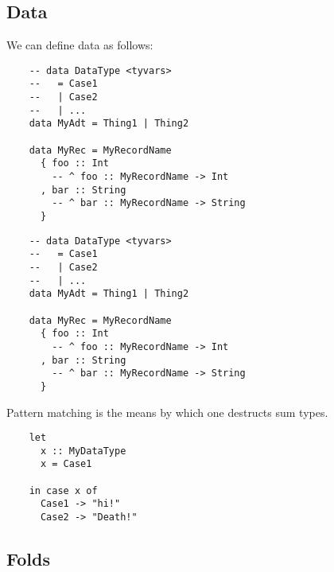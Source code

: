 \documentclass[tikz]{beamer}
\theoremstyle{definition}
\begin{document}
\subsection{Data}
\begin{frame}[fragile]

We can define data as follows: 

\begin{center}
	\begin{verbatim}
	-- data DataType <tyvars>
	--   = Case1 
	--   | Case2
	--   | ...
	data MyAdt = Thing1 | Thing2 
	
	data MyRec = MyRecordName
	  { foo :: Int 
	    -- ^ foo :: MyRecordName -> Int
	  , bar :: String
	    -- ^ bar :: MyRecordName -> String
	  }	  	  
	\end{verbatim}
\end{center}

\end{frame}

\begin{frame}[fragile]
\begin{center}
	\begin{verbatim}
	-- data DataType <tyvars>
	--   = Case1 
	--   | Case2
	--   | ...
	data MyAdt = Thing1 | Thing2 
	
	data MyRec = MyRecordName
	  { foo :: Int 
	    -- ^ foo :: MyRecordName -> Int
	  , bar :: String
	    -- ^ bar :: MyRecordName -> String
	  }  
	\end{verbatim}
\end{center}
\end{frame}

\begin{frame}[fragile]

Pattern matching is the means by which one destructs sum types.
\begin{center}
	\begin{verbatim}
	let 
	  x :: MyDataType
	  x = Case1
			
	in case x of 
	  Case1 -> "hi!"
	  Case2 -> "Death!"  
	\end{verbatim}
\end{center}
\end{frame}

\subsection{Folds}

\end{document}
